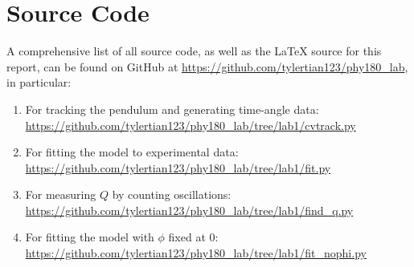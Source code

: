 \documentclass[aps,twocolumn,secnumarabic,nobalancelastpage,amsmath,amssymb,nofootinbib]{revtex4}
\begin{document}

\appendix
\section{Source Code}

A comprehensive list of all source code, as well as the \LaTeX{} source for this report, can be found on GitHub at
\url{https://github.com/tylertian123/phy180_lab}, in particular:
\label{appendix:code}
\begin{enumerate}
    \item For tracking the pendulum and generating time-angle data: \url{https://github.com/tylertian123/phy180_lab/tree/lab1/cvtrack.py}
    \item For fitting the model to experimental data: \url{https://github.com/tylertian123/phy180_lab/tree/lab1/fit.py}
    \item For measuring \(Q\) by counting oscillations: \url{https://github.com/tylertian123/phy180_lab/tree/lab1/find_q.py}
    \item For fitting the model with \(\phi\) fixed at 0: \url{https://github.com/tylertian123/phy180_lab/tree/lab1/fit_nophi.py}
\end{enumerate}
\end{document}
